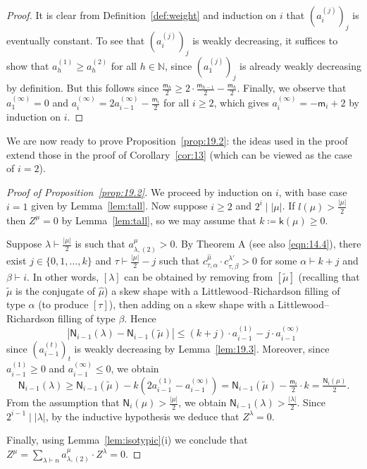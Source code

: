 \documentclass[ALCO, Unicode]{cedram}
\newcommand{\sk}{\mathsf{k}}
\newcommand{\sm}{\mathsf{m}}
\newcommand{\sn}{\mathsf{N}}
\newcommand{\N}{\mathbb{N}}
\begin{document}
\begin{proof}
	It is clear from Definition~\ref{def:weight} and induction on $i$ that $(a_i^{(j)})_j$ is eventually constant. 
	To see that $(a_i^{(j)})_j$ is weakly decreasing, it suffices to show that $a_h^{(1)}\ge a_h^{(2)}$ for all $h\in\N$, since $(a_1^{(j)})_j$ is already weakly decreasing by definition.
	But this follows since $\frac{\sm_h}{2}\ge 2\cdot\frac{\sm_{h-1}}{2}-\frac{\sm_h}{2}$.
	Finally, we observe that $a_1^{(\infty)}=0$ and $a_i^{(\infty)} = 2a_{i-1}^{(\infty)}-\frac{\sm_i}{2}$ for all $i\ge 2$, which gives $a_i^{(\infty)}=-\sm_i+2$ by induction on $i$.
\end{proof}

We are now ready to prove Proposition~\ref{prop:19.2}: the ideas used in the proof extend those in the proof of Corollary~\ref{cor:13} (which can be viewed as the case of $i=2$).

\begin{proof}[Proof of Proposition~\ref{prop:19.2}]
	We proceed by induction on $i$, with base case $i=1$ given by Lemma~\ref{lem:tall}. Now suppose $i\ge 2$ and $2^i\mid|\mu|$. If $l(\mu)>\frac{|\mu|}{2}$ then $Z^\mu=0$ by Lemma~\ref{lem:tall}, so we may assume that $k\coloneqq \sk(\mu)\ge 0$.
	
	Suppose $\lambda\vdash\frac{|\mu|}{2}$ is such that $a^\mu_{\lambda,(2)}>0$. By Theorem A (see also \eqref{eqn:14.4}), there exist $j\in\{0,1,\dotsc,k\}$ and $\tau\vdash\frac{|\mu|}{2}-j$ such that $c^{\hat{\mu}}_{\tau,\alpha}\cdot c^{\lambda'}_{\tau,\beta}>0$ for some $\alpha\vdash k+j$ and $\beta\vdash i$. In other words, $[\lambda]$ can be obtained by removing from $[\tilde{\mu}]$ (recalling that $\tilde{\mu}$ is the conjugate of $\hat{\mu}$) a skew shape with a Littlewood--Richardson filling of type $\alpha$ (to produce $[\tau]$), then adding on a skew shape with a Littlewood--Richardson filling of type $\beta$. Hence
	\[ |\sn_{i-1}(\lambda) - \sn_{i-1}(\tilde{\mu})| \le (k+j)\cdot a_{i-1}^{(1)} - j\cdot a_{i-1}^{(\infty)} \]
	since $(a_{i-1}^{(t)})_t$ is weakly decreasing by Lemma~\ref{lem:19.3}. Moreover, since $a_{i-1}^{(1)}\ge 0$ and $a_{i-1}^{(\infty)}\le 0$, we obtain
	\[ \sn_{i-1}(\lambda) \ge \sn_{i-1}(\tilde{\mu}) -k(2a_{i-1}^{(1)} - a_{i-1}^{(\infty)}) = \sn_{i-1}(\tilde{\mu}) - \tfrac{\sm_i}{2}\cdot k =\tfrac{\sn_i(\mu)}{2}. \]
	From the assumption that $\sn_i(\mu)>\frac{|\mu|}{2}$, we obtain $\sn_{i-1}(\lambda)>\frac{|\lambda|}{2}$. Since $2^{i-1}\mid|\lambda|$, by the inductive hypothesis we deduce that $Z^\lambda=0$.
	
	Finally, using Lemma~\ref{lem:isotypic}(i) we conclude that $Z^\mu=\sum_{\lambda\vdash n}a^\mu_{\lambda,(2)}\cdot Z^\lambda=0$.
\end{proof}
\end{document}
